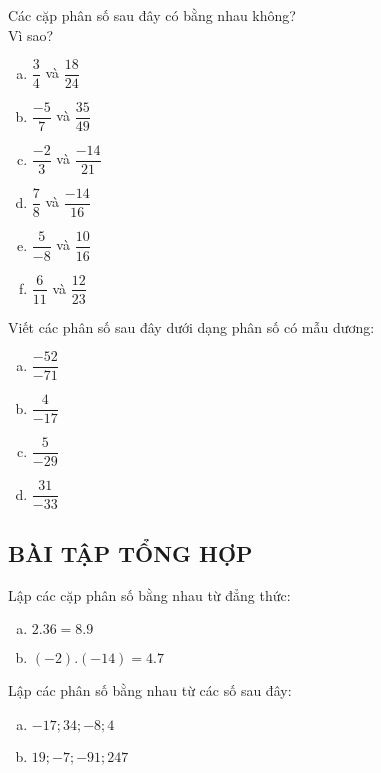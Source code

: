 \begin{bt}
Các cặp phân số sau đây có bằng nhau không? \\Vì sao?
\begin{multicols}{2}
\begin{enumerate}[a)]
\item $\dfrac{3}{4}$ và $\dfrac{18}{24}$
\item $\dfrac{-5}{7}$ và $\dfrac{35}{49}$
\item $\dfrac{-2}{3}$ và $\dfrac{-14}{21}$
\item $\dfrac{7}{8}$ và $\dfrac{-14}{16}$
\item $\dfrac{5}{-8}$ và $\dfrac{10}{16}$
\item $\dfrac{6}{11}$ và $\dfrac{12}{23}$
\end{enumerate}
\end{multicols}

\end{bt}   \begin{bt}

Viết các phân số sau đây dưới dạng phân số có mẫu dương:
\begin{multicols}{2}
\begin{enumerate}[a)]
\item $\dfrac{-52}{-71}$
\item $\dfrac{4}{-17}$
\item $\dfrac{5}{-29}$
\item $\dfrac{31}{-33}$
\end{enumerate}
\end{multicols}
\subsection{BÀI TẬP TỔNG HỢP}
\end{bt}   \begin{bt}

Lập các cặp phân số bằng nhau từ đẳng thức:
\begin{enumerate}[a)]
\item $2.36 = 8.9$
\item $(-2).(-14)= 4.7$
\end{enumerate}

\end{bt}   \begin{bt}

Lập các phân số bằng nhau từ các số sau đây:
\begin{enumerate}[a)]
\item $-17; 34; -8; 4$
\item $19; -7; -91; 247$
\end{enumerate}


\end{bt}
